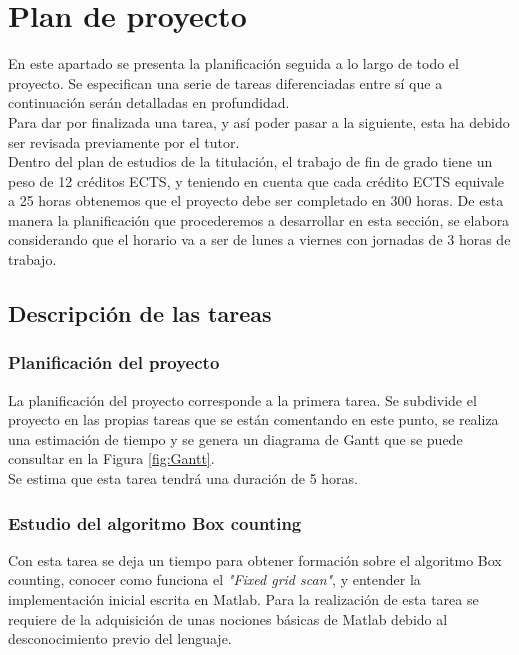 \chapter{Plan de proyecto}

En este apartado se presenta la planificación seguida a lo largo de todo el proyecto. Se especifican una serie de tareas diferenciadas entre sí que a continuación serán detalladas en profundidad.\\ Para dar por finalizada una tarea, y así poder pasar a la siguiente, esta ha debido ser revisada previamente por el tutor. \\ Dentro del plan de estudios de la titulación, el trabajo de fin de grado tiene un peso de 12 créditos ECTS, y teniendo en cuenta que cada crédito ECTS equivale a 25 horas obtenemos que el proyecto debe ser completado en 300 horas. De esta manera la planificación que procederemos a desarrollar en esta sección, se elabora considerando que el horario va a ser de lunes a viernes con jornadas de 3 horas de trabajo.\\

\section{Descripción de las tareas}
\subsection{Planificación del proyecto}
\label{tareaPlanificacion}
La planificación del proyecto corresponde a la primera tarea. Se subdivide el proyecto en las propias tareas que se están comentando en este punto, se realiza una estimación de tiempo y se genera un diagrama de Gantt que se puede consultar en la Figura \ref{fig:Gantt}.\\

Se estima que esta tarea tendrá una duración de 5 horas.

\subsection{Estudio del algoritmo Box counting}
Con esta tarea se deja un tiempo para obtener formación sobre el algoritmo Box counting, conocer como funciona el \textit{"Fixed grid scan"}, y entender la implementación inicial escrita en Matlab. Para la realización de esta tarea se requiere de la adquisición de unas nociones básicas de Matlab debido al desconocimiento previo del lenguaje.\\

